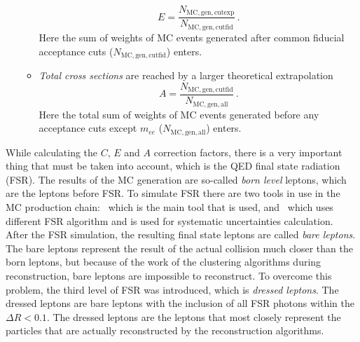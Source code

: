 \begin{itemize}
\begin{itemize}
    \begin{equation}
      E = \frac{N_\mathrm{MC, gen, cutexp}}{N_\mathrm{MC, gen, cutfid}}\,.
    \end{equation}
    Here the sum of weights of MC events generated after common fiducial acceptance cuts ($N_\mathrm{MC, gen, cutfid}$) enters.
  \item \textit{Total cross sections} are reached by a larger theoretical extrapolation
    \begin{equation}
      A = \frac{N_\mathrm{MC, gen, cutfid}}{N_\mathrm{MC, gen, all}}\,.
    \end{equation}
    Here the total sum of weights of MC events generated before any acceptance cuts except $m_{ee}$ ($N_\mathrm{MC, gen, all}$) enters.
  \end{itemize}
\end{itemize}


While calculating the $C$, $E$ and $A$ correction factors, there is a very important thing that must be taken into account, which is the QED final state radiation (FSR). The results of the MC generation are so-called {\itshape born level} leptons, which are the leptons before FSR. To simulate FSR there are two tools in use in the MC production chain: \Photos\, which is the main tool that is used, and \Sherpa\ which uses different FSR algorithm and is used for systematic uncertainties calculation. After the FSR simulation, the resulting final state leptons are called {\itshape bare leptons}. The bare leptons represent the result of the actual collision much closer than the born leptons, but because of the work of the clustering algorithms during reconstruction, bare leptons are impossible to reconstruct. To overcome this problem, the third level of FSR was introduced, which is {\itshape dressed leptons}. The dressed leptons are bare leptons with the inclusion of all FSR photons within the $\Delta R < 0.1$. The dressed leptons are the leptons that most closely represent the particles that are actually reconstructed by the reconstruction algorithms.

